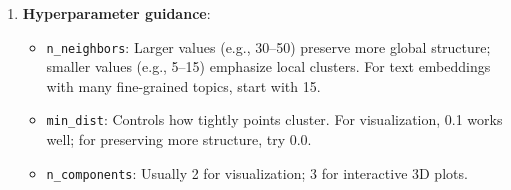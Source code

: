 \begin{remark}
\begin{enumerate}
    \item \textbf{Hyperparameter guidance}:
    \begin{itemize}
      \item \texttt{n\_neighbors}: Larger values (e.g., 30--50) preserve more global structure; smaller values (e.g., 5--15) emphasize local clusters. For text embeddings with many fine-grained topics, start with 15.
      \item \texttt{min\_dist}: Controls how tightly points cluster. For visualization, 0.1 works well; for preserving more structure, try 0.0.
      \item \texttt{n\_components}: Usually 2 for visualization; 3 for interactive 3D plots.
    \end{itemize}
  \end{enumerate}
\end{remark}

